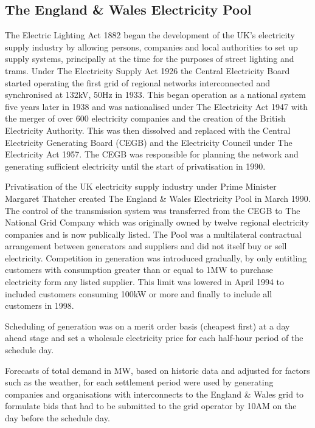 \subsection{The England \& Wales Electricity Pool}
\label{sec:thepool}
The Electric Lighting Act 1882 began the development of the UK's electricity
supply industry by allowing persons, companies and local authorities to set up
supply systems, principally at the time for the purposes of street lighting and
trams.  Under The Electricity Supply Act 1926 the Central Electricity Board
started operating the first grid of regional networks interconnected and
synchronised at 132kV, 50Hz in 1933.  This began operation as a national system
five years later in 1938 and was nationalised under The Electricity Act 1947
with the merger of over 600 electricity companies and the creation of the
British Electricity Authority.  This was then dissolved and replaced with the
Central Electricity Generating Board (CEGB) and the Electricity Council under
The Electricity Act 1957.  The CEGB was responsible for planning the network
and generating sufficient electricity until the start of privatisation in 1990.

Privatisation of the UK electricity supply industry under Prime Minister
Margaret Thatcher created The England \& Wales Electricity Pool in March 1990.
The control of the transmission system was transferred from the CEGB to The
National Grid Company which was originally owned by twelve regional electricity
companies and is now publically listed.  The Pool was a multilateral
contractual arrangement between generators and suppliers and did not itself buy
or sell electricity.  Competition in generation was introduced gradually, by
only entitling customers with consumption greater than or equal to 1MW to
purchase electricity form any listed supplier.  This limit was lowered in April
1994 to included customers consuming 100kW or more and finally to include all
customers in 1998.

Scheduling of generation was on a merit order basis (cheapest first) at a day
ahead stage and set a wholesale electricity price for each half-hour period of
the schedule day.

Forecasts of total demand in MW, based on historic data and adjusted for
factors such as the weather, for each settlement period were used by generating
companies and organisations with interconnects to the England \& Wales grid to
formulate bids that had to be submitted to the grid operator by 10AM on the day
before the schedule day.

